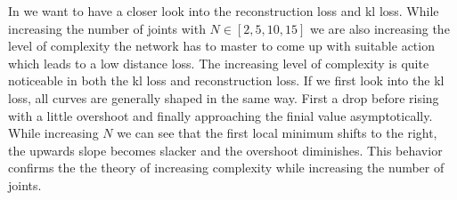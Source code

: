 In  we want to have a closer look into the reconstruction loss and kl loss. While increasing the number of joints with $N \in [2, 5, 10, 15]$ we are also increasing the level of complexity the network has to master to come up with  suitable action which leads to a low distance loss. The increasing level of complexity is quite noticeable in both the kl loss and reconstruction loss. If we first look into the kl loss, all curves are generally shaped in the same way. First a drop before rising with a little overshoot and finally approaching the finial value asymptotically. While increasing $N$ we can see that the first local minimum shifts to the right, the upwards slope becomes slacker and the overshoot diminishes. This behavior confirms the the theory of increasing complexity while increasing the number of joints.

